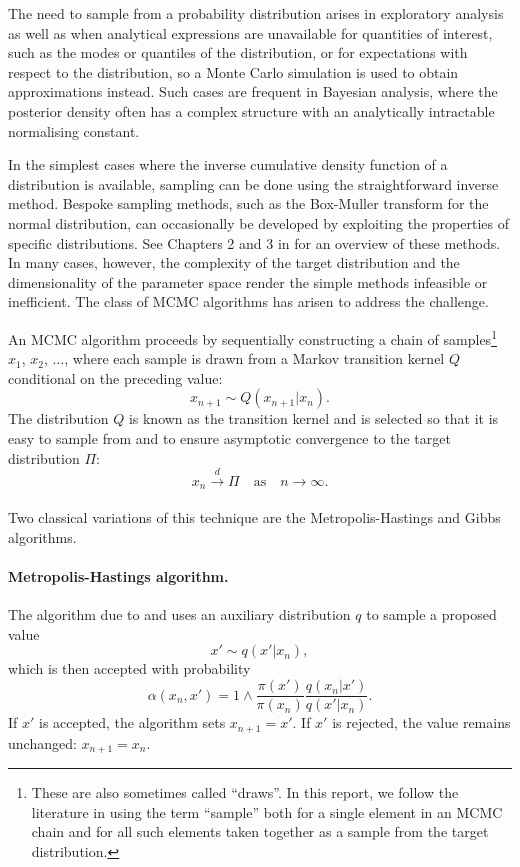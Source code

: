 \documentclass[11pt,a4paper]{report}
\begin{document}
The need to sample from a probability distribution arises in exploratory analysis as well as when analytical expressions are unavailable for quantities of interest, such as the modes or quantiles of the distribution, or for expectations with respect to the distribution, so a Monte Carlo simulation is used to obtain approximations instead. Such cases are frequent in Bayesian analysis, where the posterior density often has a complex structure with an analytically intractable normalising constant.

In the simplest cases where the inverse cumulative density function of a distribution is available, sampling can be done using the straightforward inverse method. Bespoke sampling methods, such as the Box-Muller transform for the normal distribution, can occasionally be developed by exploiting the properties of specific distributions. See Chapters 2 and 3 in \cite{robertMonteCarloStatistical2004} for an overview of these methods. In many cases, however, the complexity of the target distribution and the dimensionality of the parameter space render the simple methods infeasible or inefficient. The class of MCMC algorithms has arisen to address the challenge.


An MCMC algorithm proceeds by sequentially constructing a chain of samples\footnote{These are also sometimes called ``draws''. In this report, we follow the literature in using the term ``sample'' both for a single element in an MCMC chain and for all such elements taken together as a sample from the target distribution.} $x_1$, $x_2$, $\dots$,  where each sample is drawn from a Markov transition kernel $Q$ conditional on the preceding value:
$$x_{n+1} \sim Q(x_{n+1}|x_n).$$
The distribution $Q$ is known as the transition kernel and is selected so that it is easy to sample from and to ensure asymptotic convergence to the target distribution $\Pi$:
$$x_n \xrightarrow[]{d} \Pi \quad\text{as}\quad n \to \infty.$$

Two classical variations of this technique are the Metropolis-Hastings and Gibbs algorithms.

\paragraph{Metropolis-Hastings algorithm.} The algorithm due to \cite{metropolisEquationStateCalculations1953} and \cite{hastingsMonteCarloSampling1970} uses an auxiliary distribution $q$ to sample a proposed value
$$x' \sim q(x' | x_n),$$
which is then accepted with probability
$$\alpha(x_n, x') = 1 \wedge \frac{\pi(x')}{\pi(x_n)} \frac{q(x_n|x')}{q(x'|x_n)}.$$
If $x'$ is accepted, the algorithm sets $x_{n+1} = x'$. If $x'$ is rejected, the value remains unchanged: $x_{n+1} = x_n$.
\end{document}
